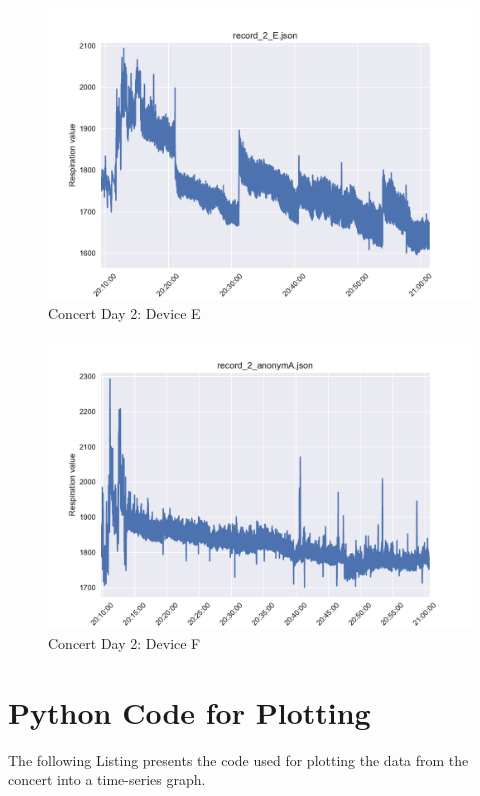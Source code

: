 \begin{figure}
    \centering
    \includegraphics[scale=0.6]{images/record_2_e.pdf}
    \caption{Concert Day 2: Device E}
    \label{fig:concert_day2_e}
\end{figure}

\begin{figure}
    \centering
    \includegraphics[scale=0.6]{images/record_2_f.pdf}
    \caption{Concert Day 2: Device F}
    \label{fig:concert_day2_f}
\end{figure}

\newpage
\section{Python Code for Plotting}
The following Listing presents the code used for plotting the data from the concert into a time-series graph. 

